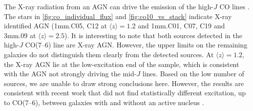 \documentclass[twocolumn]{aastex62}
\newcommand{\avg}[1]{\ensuremath{\langle #1 \rangle}}
\begin{document}
The X-ray radiation from an AGN can drive the emission of the high-$J$ CO lines
\citep[e.g.,][]{Meijerink2007, vanderWerf2010, Vallini2019}.  The stars in
\autoref{fig:co_individual_flux} and \autoref{fig:co10_vs_stack} indicate X-ray
identified AGN (1mm.C05, C12 at $\avg{z}=1.2$ and 1mm.C01, C07, C19 and 3mm.09
at $\avg{z} = 2.5$).  It is interesting to note that both sources detected in
the high-$J$ CO(7--6) line are X-ray AGN.  However, the upper limits on the
remaining galaxies do not distinguish them clearly from the detected sources.
At $\avg{z}=1.2$, the X-ray AGN lie at the low-excitation end of the sample,
which is consistent with the AGN not strongly driving the mid-$J$ lines.  Based
on the low number of sources, we are unable to draw strong conclusions here.
However, the results are consistent with recent work that did not find
statistically different excitation, up to CO(7--6), between galaxies with and
without an active nucleus \citep[e.g.,][]{Sharon2016, Kirkpatrick2019}.
\end{document}
